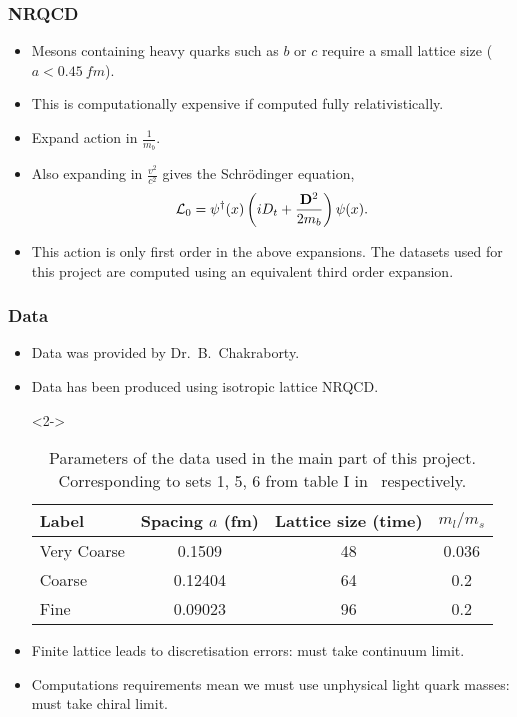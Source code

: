 \documentclass{beamer}
\begin{document}
\begin{frame}
\frametitle{NRQCD}
\begin{itemize}
    \item<1-> Mesons containing heavy quarks such as $b$ or $c$ require a small lattice size ($a<\SI{0.45}{fm}$).
    \item<1-> This is computationally expensive if computed fully relativistically.
    \item<2-> Expand action in $\frac{1}{m_b}$.
    \item<2-> Also expanding in $\frac{v^2}{c^2}$ gives the Schrödinger equation\cite{2015Colquhoun}, 
        \begin{equation*}
            \mathcal{L}_0 = \psi^\dagger(x)\left(i D_t + \frac{\vb{D}^2}{2m_b}\right)\psi(x).
        \end{equation*}
    \item<2-> This action is only first order in the above expansions. The datasets used for this project are computed using an equivalent third order expansion.
\end{itemize}
\end{frame}

\begin{frame}
\frametitle{Data}
\begin{itemize}
    \item<1-> Data was provided by Dr.\ B.\ Chakraborty.
    \item<1-> Data has been produced using isotropic lattice NRQCD\cite{chakraborty2021improved}.
    \item[]<2-> 
        \begin{table}
            \centering
            \begin{tabular}{l S[table-format=1.5] S[table-format=2.0] S[table-format=1.3]}
Label       & {Spacing $a$ (\si{fm})}   & {Lattice size (time)} & {$m_l / m_s$}\\
\midrule 
Very Coarse & 0.1509                    & 48                    & 0.036\\
Coarse      & 0.12404                   & 64                    & 0.2\\
Fine        & 0.09023                   & 96                    & 0.2\\
            \end{tabular}
            \caption{Parameters of the data used in the main part of this project. Corresponding to sets 1, 5, 6 from table I in~\cite{chakraborty2021improved} respectively.}
        \end{table}
    \item<3-> Finite lattice leads to discretisation errors: must take continuum limit.
    \item<4-> Computations requirements mean we must use unphysical light quark masses: must take chiral limit.
\end{itemize}
\end{frame}
\end{document}
